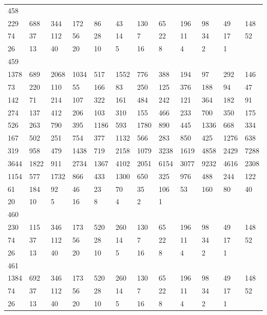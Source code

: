 \begin{longtable}{llllllllllll}
458&&&&&&&&&&&\\
229& 688& 344& 172& 86& 43& 130& 65& 196& 98& 49& 148\\
74& 37& 112& 56& 28& 14& 7& 22& 11& 34& 17& 52\\
26& 13& 40& 20& 10& 5& 16& 8& 4& 2& 1& \\

459&&&&&&&&&&&\\
1378& 689& 2068& 1034& 517& 1552& 776& 388& 194& 97& 292& 146\\
73& 220& 110& 55& 166& 83& 250& 125& 376& 188& 94& 47\\
142& 71& 214& 107& 322& 161& 484& 242& 121& 364& 182& 91\\
274& 137& 412& 206& 103& 310& 155& 466& 233& 700& 350& 175\\
526& 263& 790& 395& 1186& 593& 1780& 890& 445& 1336& 668& 334\\
167& 502& 251& 754& 377& 1132& 566& 283& 850& 425& 1276& 638\\
319& 958& 479& 1438& 719& 2158& 1079& 3238& 1619& 4858& 2429& 7288\\
3644& 1822& 911& 2734& 1367& 4102& 2051& 6154& 3077& 9232& 4616& 2308\\
1154& 577& 1732& 866& 433& 1300& 650& 325& 976& 488& 244& 122\\
61& 184& 92& 46& 23& 70& 35& 106& 53& 160& 80& 40\\
20& 10& 5& 16& 8& 4& 2& 1& \\

460&&&&&&&&&&&\\
230& 115& 346& 173& 520& 260& 130& 65& 196& 98& 49& 148\\
74& 37& 112& 56& 28& 14& 7& 22& 11& 34& 17& 52\\
26& 13& 40& 20& 10& 5& 16& 8& 4& 2& 1& \\

461&&&&&&&&&&&\\
1384& 692& 346& 173& 520& 260& 130& 65& 196& 98& 49& 148\\
74& 37& 112& 56& 28& 14& 7& 22& 11& 34& 17& 52\\
26& 13& 40& 20& 10& 5& 16& 8& 4& 2& 1& \\


\end{longtable}
